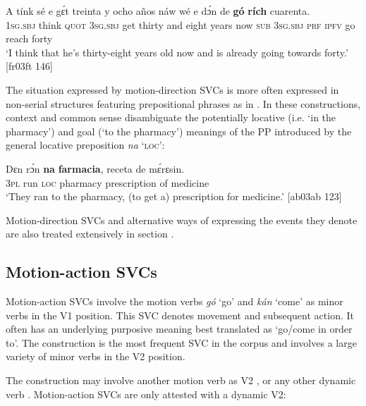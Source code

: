 \ea%
    \label{ex:key:1548}
    \gll A    tínk    sé    e    gɛ́t  treinta  y  ocho  años  náw
wé  e    dɔ́n  de  \textbf{gó}  \textbf{rích}    cuarenta.\\
\textsc{1sg.sbj}  think  \textsc{quot}    \textsc{3sg.sbj}  get  thirty  and  eight  years  now
\textsc{sub}  \textsc{3sg.sbj}  \textsc{prf}  \textsc{ipfv}  go  reach  forty\\

\glt ‘I think that he’s thirty-eight years old now and is already going towards forty.’ [fr03ft 146]
\z

The situation expressed by motion-direction SVCs is more often expressed in non-serial structures featuring prepositional phrases as in . In these constructions, context and common sense disambiguate the potentially locative (i.e. ‘in the pharmacy’) and goal (‘to the pharmacy’) meanings of the PP introduced by the general locative preposition \textit{na} ‘\textsc{loc}’:


\ea%
    \label{ex:key:1549}
    \gll Dɛn  rɔ́n    \textbf{na}  \textbf{farmacia},  receta    de  mɛ́rɛsin.\\
\textsc{3pl}  run    \textsc{loc}  pharmacy  prescription  of  medicine\\

\glt ‘They ran to the pharmacy, (to get a) prescription for medicine.’ [ab03ab 123]
\z

Motion-direction SVCs and alternative ways of expressing the events they denote are also treated extensively in section .

\subsection{Motion-action SVCs}

Motion-action SVCs involve the motion verbs \textit{gó} ‘go’ and \textit{kán} ‘come’ as minor verbs in the V1 position. This SVC denotes movement and subsequent action. It often has an underlying purposive meaning best translated as ‘go/come in order to’. The construction is the most frequent SVC in the corpus and involves a large variety of minor verbs in the V2 position.


The construction may involve another motion verb as V2 , or any other dynamic verb . Motion-action SVCs are only attested with a dynamic V2:



